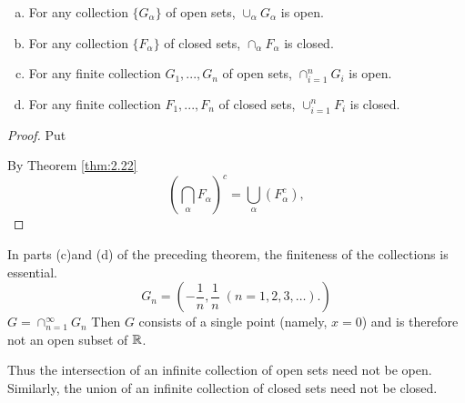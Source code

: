 \begin{thm}
    \label{thm:2.24}
    \begin{enumerate}[(a)]
        \item For any collection $\{G_\alpha\}$ of open sets,  $\cup_\alpha G_\alpha$ is open.
        \item For any collection $\{F_\alpha\}$ of closed sets, $\cap_\alpha F_\alpha$ is closed.
        \item For any finite collection $G_1, ..., G_n$ of open sets, $\cap_{i=1}^n G_i$ is open.
        \item For any finite collection $F_1, ..., F_n$ of closed sets, $\cup_{i=1}^n F_i$ is closed.
    \end{enumerate}
\end{thm}

\begin{proof}
    Put 

    By Theorem \ref{thm:2.22}
    \begin{equation}
        \label{eq:2.21}
        \left( \bigcap_\alpha F_\alpha \right)^c = 
        \bigcup_\alpha \left( F_\alpha^c \right),
    \end{equation}
\end{proof}


\begin{newexample}
    In parts (c)and (d) of the preceding theorem, the finiteness of the collections is essential.
    \begin{equation*}
        G_n = \left(-\frac{1}{n}, \frac{1}{n} \; (n=1,2,3,\dots). \right)
    \end{equation*}
    $G = \cap_{n=1}^\infty G_n$
    Then $G$ consists of a single point (namely, $x = 0$) and is therefore not an open subset of ${\protect\mathbb R}$.
    
    Thus the intersection of an infinite collection of open sets need not be open. Similarly, the union of an infinite collection of closed sets need not be closed.
\end{newexample}

